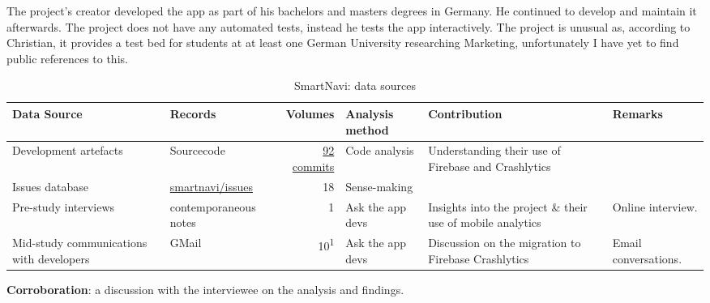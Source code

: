     
The project's creator developed the app as part of his bachelors and masters degrees in Germany. He continued to develop and maintain it afterwards. The project does not have any automated tests, instead he tests the app interactively.  The project is unusual as, according to Christian, it provides a test bed for students at at least one German University researching Marketing, unfortunately I have yet to find public references to this.


\begin{table*}
    \centering
    \footnotesize
    \tabcolsep=0.12cm
    \begin{tabular}{>{\raggedright}p{3cm}p{2.4cm}r>{\raggedright}p{2.1cm}>{\raggedright\arraybackslash}p{3cm}>{\raggedright\arraybackslash}p{2.2cm}}
        Data Source & Records & Volumes & Analysis method & Contribution & Remarks \\
        \toprule
        Development artefacts & Sourcecode\footnotemark & \href{https://github.com/Phantast/smartnavi/commits/master}{92 commits} & Code analysis & Understanding their use of Firebase and Crashlytics & \\
        Issues database & \href{https://github.com/Phantast/smartnavi/issues}{smartnavi/issues} & 18 &Sense-making & \\
        Pre-study interviews & contemporaneous notes & 1 & Ask the app devs & Insights into the project \& their use of mobile analytics & Online interview. \\
        Mid-study communications with developers & GMail & 10\textsuperscript{1} & Ask the app devs & Discussion on the migration to Firebase Crashlytics & Email conversations. \\
         \bottomrule
    \end{tabular}
    \caption{SmartNavi: data sources}
    \label{tab:smartnavi-data-sources}
\end{table*}



\textbf{Corroboration}: a discussion with the interviewee on the analysis and findings. 






